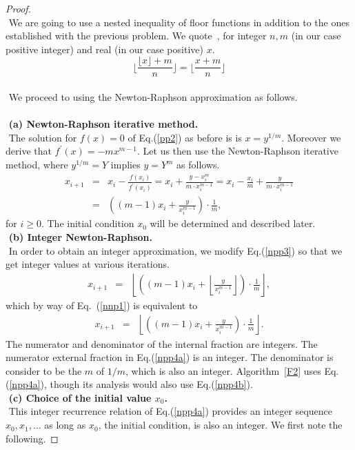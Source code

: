 \documentclass[11pt]{article}
\newcommand{\floor}[1]{\lfloor #1 \rfloor}
\begin{document}
\begin{proof}
%
$ $ \\ $ $
We are going to use a nested inequality of floor functions
in addition to the ones established with the previous problem.
We quote~\cite{Wiki26a}, for integer $n,m$ (in our case positive
integer) and real (in our case positive) $x$.
\begin{equation}
\label{nnp1}
\lfloor \frac{\floor{x} + m}{n} \rfloor
=
\lfloor \frac{x + m}{n} \rfloor
\end{equation}
$ $ \\ $ $
We proceed to using the  Newton-Raphson approximation as follows. \\
$ $ \\ $ $
{\bf (a) Newton-Raphson iterative method.}
$ $ \\ $ $
The solution for $f(x)=0$ of Eq.(\ref{pp2}) as before is
is $x = y^{1/m}$. Moreover we derive that
$f^\prime (x) = - m x^{m-1}$.
Let us then use the Newton-Raphson iterative method, where
$y^{1/m} = Y$ implies $y = Y^m$ as follows.
\begin{eqnarray}
\label{npp3}
x_{i+1} &=& x_{i} - \frac{f(x_i ) }{ f^\prime (x_i )}
        = x_i + \frac{y-x_i^m}{m \cdot x_i^{m-1}}
        = x_i - \frac{x_i}{m} + \frac{y}{m \cdot x_i^{m-1}}  \nonumber \\
        &=& \left( (m-1) x_i  +  \frac{y}{x_i^{m-1}} \right)
            \cdot  \frac{1}{m},
\end{eqnarray}
for $i \geq 0$.  The initial condition  $x_0$ will be determined 
and described later.
%
%
%
$ $ \\ $ $
{\bf (b) Integer Newton-Raphson.}
$ $ \\ $ $
In order to obtain an integer approximation, we
modify Eq.(\ref{npp3}) so that we get integer values at various
iterations.
\begin{eqnarray}
x_{i+1}
&=&
\label{npp4a}
  \left\lfloor
     \left( (m-1) x_i + \left\lfloor \frac{y}{x_i^{m-1}} \right\rfloor
     \right) \cdot  \frac{1}{m}
  \right\rfloor ,
\end{eqnarray}
which by way of Eq.~(\ref{nnp1}) is equivalent to
\begin{eqnarray}
x_{i+1}
&=&
\label{npp4b}
  \left\lfloor
     \left( (m-1) x_i +   \frac{y}{x_i^{m-1}}
     \right) \cdot  \frac{1}{m}
  \right\rfloor .
\end{eqnarray}
The numerator and denominator of the internal fraction are
integers.
The numerator external fraction in Eq.(\ref{npp4a}) is an
integer. The denominator is consider to be the $m$ of $1/m$,
which is also an integer. Algorithm~\ref{F2} uses Eq.(\ref{npp4a}),
though its analysis would also use Eq.(\ref{npp4b}).
%
%
%
$ $ \\ $ $
{\bf (c) Choice of the initial value $x_0$.}
$ $ \\ $ $
This integer recurrence relation of Eq.(\ref{npp4a}) provides 
an integer sequence $x_0 , x_1 , \ldots $ as long as 
$x_0$, the initial condition, is also an integer.
We first note the following.


\end{proof}
\end{document}
